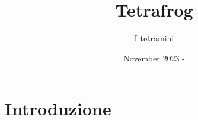 \documentclass{article}
\begin{document}
\title{Tetrafrog}
\author{I tetramini}
\date{November 2023 - }
\maketitle

\section{Introduzione}


\end{document}

